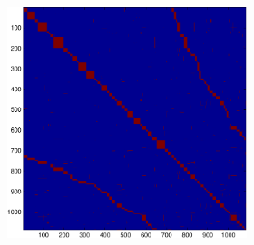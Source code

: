 \documentclass{article} %
\begin{document}
\begin{figure}
\begin{subfigure}[c]{\textwidth}
\begin{subfigure}[c]{0.195\textwidth}
			\includegraphics[width = \textwidth]{./img/adj1_22_s.pdf}
			\label{fig1_22_s_adj}
		\end{subfigure}
	\end{subfigure}


\end{figure}
\end{document}
